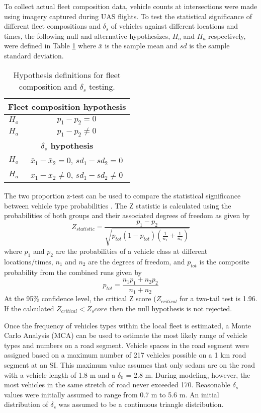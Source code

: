 To collect actual fleet composition data, vehicle counts at intersections were made using imagery captured during UAS flights. To test the statistical significance of different fleet compositions and $\delta_{s}$ of vehicles against different locations and times, the following null and alternative hypothesizes, $H_{o}$ and $H_{a}$ respectively, were defined in Table \ref{tab:vehhyp} where $\bar{x}$ is the sample mean and $sd$ is the sample standard deviation. 
%
\begin{table}[H]
\centering
\caption{Hypothesis definitions for fleet composition and $\delta_{s}$ testing.}
\label{tab:vehhyp}
\begin{tabular}{@{}cc@{}}
\toprule
\multicolumn{2}{c}{\textbf{Fleet composition hypothesis}} \\ \midrule
$H_{o}$ & $p_{1} - p_{2} = 0$ \\
$H_{a}$ & $p_{1} - p_{2} \ne 0$\\ \midrule
\multicolumn{2}{c}{\textbf{$\delta_{s}$ hypothesis}} \\ \midrule
$H_{o}$ & $\bar{x}_{1} - \bar{x}_{2} = 0$, $sd_{1} - sd_{2} = 0$ \\
$H_{a}$ & $\bar{x}_{1} - \bar{x}_{2} \ne 0$, $sd_{1} - sd_{2} \ne 0$ \\ \bottomrule
\end{tabular}
\end{table}
%
The two proportion z-test can be used to compare the statistical significance between vehicle type probabilities \citep{Presnell2008}. The Z statistic is calculated using the probabilities of both groups and their associated degrees of freedom as given by
% 
\begin{equation}
\label{eq:2zteststat}
Z_{statistic} = \frac{p_{1}-p_{2}}{\sqrt{p_{tot}(1-p_{tot})\left ( \frac{1}{n_{1}}+\frac{1}{n_{2}} \right )}}
\end{equation}
%
\noindent
where $p_{1}$ and $p_{2}$ are the probabilities of a vehicle class at different locations/times, $n_{1}$ and $n_{2}$ are the degrees of freedom, and $p_{tot}$ is the composite probability from the combined runs given by
% 
\begin{equation}
\label{eq:2ztesttot}
p_{tot}=\frac{n_{1}p_{1} + n_{2}p_{2}}{n_{1}+n_{2}}
\end{equation}
%
At the 95\% confidence level, the critical Z score ($Z_{critical}$ for a two-tail test is 1.96. If the calculated $Z_{critical} < Z_score$ then the null hypothesis is not rejected. 

Once the frequency of vehicles types within the local fleet is estimated, a Monte Carlo Analysis (MCA) can be used to estimate the most likely range of vehicle types and numbers on a road segment. Vehicle spaces in the road segment were assigned based on a maximum number of 217 vehicles possible on a 1 km road segment at an SI.  This maximum value assumes that only sedans are on the road with a vehicle length of 1.8 m and a $\delta_{0}$ = 2.8 m.  During modeling, however, the most vehicles in the same stretch of road never exceeded 170.  Reasonable $\delta_{s}$ values were initially assumed to range from 0.7 m to 5.6 m. An initial distribution of $\delta_{s}$ was assumed to be a continuous triangle distribution.
 
